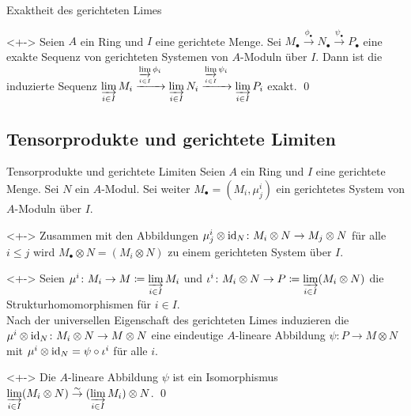 \begin{frame}{Exaktheit des gerichteten Limes}
	\begin{proposition}<+->
		Seien \(A\) ein Ring und \(I\) eine gerichtete Menge. Sei
		\(M_\bullet \xrightarrow{\phi_\bullet} N_\bullet \xrightarrow{\psi_\bullet}
		P_\bullet\) eine exakte Sequenz von gerichteten Systemen von \(A\)-Moduln über \(I\).
		Dann ist die induzierte Sequenz
		\(\varinjlim\limits_{i \in I} M_i \xrightarrow{\varinjlim\limits_{i \in I} \phi_i}
		\varinjlim\limits_{i \in I} N_i \xrightarrow{\varinjlim\limits_{i \in I} \psi_i}
		\varinjlim\limits_{i \in I} P_i\)
		exakt.
		\qed
	\end{proposition}
\end{frame}

\subsection{Tensorprodukte und gerichtete Limiten}

\begin{frame}{Tensorprodukte und gerichtete Limiten}
	Seien \(A\) ein Ring und \(I\) eine gerichtete Menge. Sei \(N\) ein \(A\)-Modul.
	Sei weiter \(M_\bullet = (M_i, \mu^i_j)\) ein gerichtetes System von \(A\)-Moduln über \(I\).
	\begin{example}<+->
		Zusammen mit den Abbildungen \(\mu^i_j \otimes \operatorname{id}_N\colon M_i \otimes N \to M_j \otimes N\) für
		alle \(i \le j\) wird \(M_\bullet \otimes N = (M_i \otimes N)\) zu einem gerichteten System über \(I\).
	\end{example}
	\begin{visibleenv}<+->
		Seien \(\mu^i\colon M_i \to M \coloneqq \varinjlim\limits_{i \in I} M_i\) 
		und \(\iota^i\colon M_i \otimes N \to P \coloneqq \varinjlim\limits_{i \in I} (M_i \otimes N)\)
		die Strukturhomomorphismen für \(i \in I\).
		\\
		Nach der universellen Eigenschaft des gerichteten Limes induzieren die \(\mu^i \otimes \operatorname{id}_N\colon M_i \otimes N \to
		M \otimes N\) eine eindeutige \(A\)-lineare Abbildung \(\psi\colon P
		\to M \otimes N\) mit \(\mu^i \otimes \operatorname{id}_N = \psi \circ \iota^i\) für alle \(i\).
	\end{visibleenv}
	\begin{proposition}<+->
		Die \(A\)-lineare Abbildung \(\psi\) ist ein Isomorphismus
		\(\varinjlim\limits_{i \in I} (M_i \otimes N) \stackrel\sim\to (\varinjlim\limits_{i \in I} M_i) \otimes N\).
		\qed
	\end{proposition}
\end{frame}

